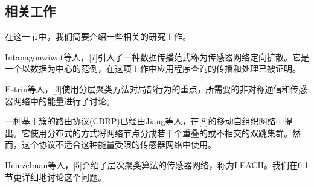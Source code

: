 \documentclass[journal]{IEEEtran}
\begin{document}
\begin{CJK}{UTF8}{gbsn}
%





\section{\textbf{相关工作}}


在这一节中，我们简要介绍一些相关的研究工作。

Intanagonwiwat等人，[7]引入了一种数据传播范式称为传感器网络定向扩散。它是一个以数据为中心的范例，在这项工作中应用程序查询的传播和处理已被证明。



Estrin等人，[3]使用分层聚类方法对局部行为的重点，所需要的非对称通信和传感器网络中的能量进行了讨论。


一种基于簇的路由协议(CBRP)已经由Jiang等人，在[8]的移动自组织网络中提出。它使用分布式的方式将网络节点分成若干个重叠的或不相交的双跳集群。然而，这个协议不适合这种能量受限的传感器网络中使用。



Heinzelman等人，[5]介绍了层次聚类算法的传感器网络，称为LEACH。我们在6.1节更详细地讨论这个问题。



\end{CJK}
\end{document}
